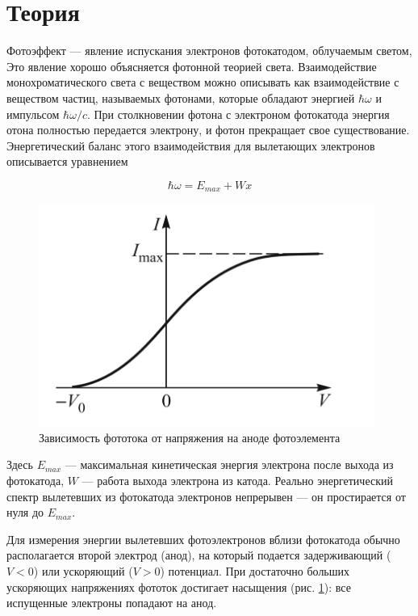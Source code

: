 \documentclass[15pt,a5paper,reqno]{article}
\begin{document}
\section{Теория}

	
	Фотоэффект --- явление испускания электронов фотокатодом, облучаемым светом,  Это явление хорошо объясняется фотонной теорией света. Взаимодействие монохроматического света с веществом можно описывать
	как взаимодействие с веществом частиц, называемых фотонами, которые обладают энергией $ \hbar \omega $ и импульсом $ \hbar\omega/c $. При столкновении фотона с электроном фотокатода энергия отона полностью передается электрону, и фотон прекращает свое существование. Энергетический баланс этого взаимодействия для вылетающих электронов
	описывается уравнением
	

	\begin{equation}\label{energy_bal}
		\hbar \omega = E_{max} + Wx 
	\end{equation}

	\begin{figure}[h]
		\centering
		\includegraphics[width=11cm]{pics/I(V).png}
		\caption{Зависимость фототока от напряжения на аноде фотоэлемента}
		\label{VAC}
	\end{figure}

	
	Здесь $ E_{max} $ ---  максимальная кинетическая энергия электрона после выхода из фотокатода, $ W $ --- работа выхода электрона из катода. Реально энергетический спектр вылетевших из фотокатода электронов непрерывен --- он простирается от нуля до $ E_{max} $. 
	
	Для измерения энергии вылетевших фотоэлектронов вблизи фотокатода
	обычно располагается второй электрод
	(анод), на который подается задерживающий ($ V < 0 $) или ускоряющий ($ V >
	0 $) потенциал. При достаточно больших
	ускоряющих напряжениях фототок достигает насыщения (рис. \ref{VAC}): все испущенные электроны попадают на анод.
	
\end{document}
